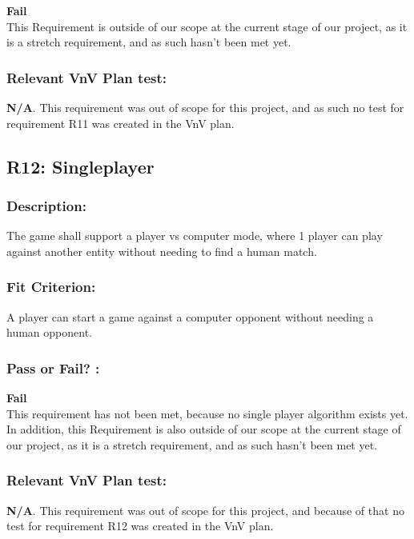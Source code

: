 \documentclass[12pt, titlepage]{article}
\begin{document}
 \noindent \textbf{Fail}\\
 
  This Requirement is outside of our scope at the current stage of our project, as it is a stretch requirement, and as such hasn't been met yet.

\subsubsection*{Relevant VnV Plan test: } \textbf{N/A}. This requirement was out of scope for this project, and as such no test for requirement R11 was created in the VnV plan.


\subsection{R12: Singleplayer} 
\label{R12} 

\subsubsection*{Description:}The game shall support a player vs computer mode, where 1 player can play against another entity without needing to find a human match.

\subsubsection*{Fit Criterion:} A player can start a game against a computer opponent without needing a human opponent.

\subsubsection*{Pass or Fail? :} 

 \noindent \textbf{Fail}\\
 
 This requirement has not been met, because no single player algorithm exists yet. In addition, this Requirement is also outside of our scope at the current stage of our project, as it is a stretch requirement, and as such hasn't been met yet.

\subsubsection*{Relevant VnV Plan test: } \textbf{N/A}. This requirement was out of scope for this project, and because of that no test for requirement R12 was created in the VnV plan.
\end{document}
